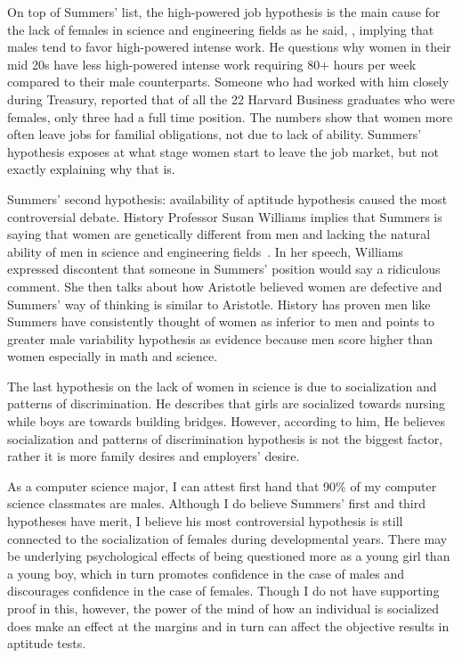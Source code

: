 \par
On top of Summers’ list, the high-powered job hypothesis is the main cause for the lack of females 
in science and engineering fields as he said, \cite{summers}, 
implying that males tend to favor high-powered intense work. He questions why women in their mid 20s 
have less high-powered intense work requiring 80+ hours per week compared to their male counterparts. 
Someone who had worked with him closely during Treasury, reported that of all the 22 Harvard Business 
graduates who were females, only three had a full time position. The numbers show that women more often 
leave jobs for familial obligations, not due to lack of ability. Summers' hypothesis exposes at what 
stage women start to leave the job market, but not exactly explaining why that is.

\par
Summers’ second hypothesis: availability of aptitude hypothesis caused the most controversial debate. 
History Professor Susan Williams implies that Summers is saying that women are genetically different 
from men and lacking the natural ability of men in science and engineering fields~\cite{williams}. 
In her speech, Williams expressed discontent that someone in Summers’ position would say a ridiculous 
comment. She then talks about how Aristotle believed women are defective and Summers' way of thinking 
is similar to Aristotle. History has proven men like Summers have consistently thought of women as 
inferior to men and points to greater male variability hypothesis as evidence because men score higher 
than women especially in math and science.	

\par
The last hypothesis on the lack of women in science is due to socialization and patterns of discrimination. 
He describes that girls are socialized towards nursing while boys are towards building bridges. However, 
according to him, \cite{summers} He believes socialization and patterns of 
discrimination hypothesis is not the biggest factor, rather it is more family desires and employers’ desire.

\par
As a computer science major, I can attest first hand that 90\% of my computer science classmates are males. 
Although I do believe Summers' first and third hypotheses have merit, I believe his most controversial 
hypothesis is still connected to the socialization of females during developmental years. There may be 
underlying psychological effects of being questioned more as a young girl than a young boy, which in turn 
promotes confidence in the case of males and discourages confidence in the case of females. Though I do 
not have supporting proof in this, however, the power of the mind of how an individual is socialized does 
make an effect at the margins and in turn can affect the objective results in aptitude tests.	

